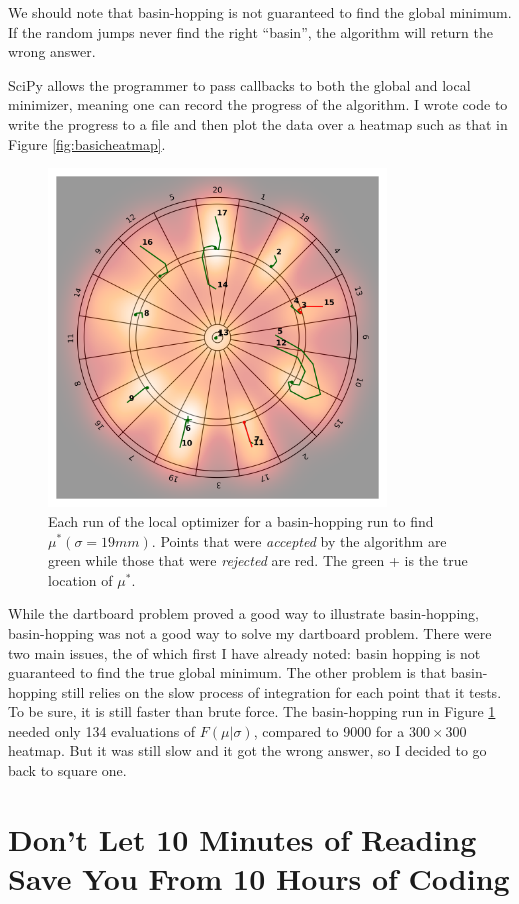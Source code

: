\documentclass[]{article}
\newcommand{\mustar}{\ensuremath{\mu^* }}
\begin{document}
We should note that basin-hopping is not guaranteed to find the global minimum. If the random jumps never find the right ``basin'', the algorithm will return the wrong answer.

SciPy allows the programmer to pass callbacks to both the global and local minimizer, meaning one can record the progress of the algorithm. I wrote code to write the progress to a file and then plot the data over a heatmap such as that in Figure \ref{fig:basicheatmap}.
\begin{figure}[h!]
	\centering
	\includegraphics[width=0.8\textwidth]{../images/sig19basin.png}
	\caption{Each run of the local optimizer for a basin-hopping run to find $\mustar(\sigma=19mm)$.  Points that were \textit{accepted} by the algorithm are green while those that were \textit{rejected} are red. The green + is the true location of \mustar.}
	\label{fig:basin}
\end{figure}

While the dartboard problem proved a good way to illustrate basin-hopping, basin-hopping was not a good way to solve my dartboard problem. There were two main issues, the of which first I have already noted: basin hopping is not guaranteed to find the true global minimum. The other problem is that basin-hopping still relies on the slow process of integration for each point that it tests. To be sure, it is still faster than brute force. The basin-hopping run in Figure \ref{fig:basin} needed only 134 evaluations of $F(\mu \vert \sigma)$, compared to 9000 for a $300 \times 300$ heatmap. But it was still slow and it got the wrong answer, so I decided to go back to square one.

\section{Don't Let 10 Minutes of Reading Save You From 10 Hours of Coding}










	

\printbibliography
\end{document}
